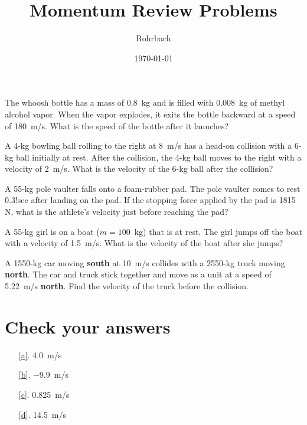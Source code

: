 \documentclass[10pt]{exam}
\title{Momentum Review Problems}
\author{Rohrbach}
\date{\today}
\begin{document}
\maketitle

\begin{questions}


\question
  The whoosh bottle has a mass of 0.8~kg and is filled with 0.008~kg of methyl alcohol vapor.  When the vapor explodes, it exits the bottle backward at a speed of 180~m/s.  What is the speed of the bottle after it launches?
  \vs


  
\question \label{a}
  A 4-kg bowling ball rolling to the right at 8~m/s has a head-on collision with a 6-kg ball initially at rest. After the collision, the 4-kg ball moves to the right with a velocity of 2~m/s. What is the velocity of the 6-kg ball after the collision?
  \vs


\question \label{b}
  A 55-kg pole vaulter falls onto a foam-rubber pad. The pole vaulter comes to rest 0.3!sec after landing on the pad. If the stopping force applied by the pad is 1815 N, what is the athlete's velocity just before reaching the pad?
  \vs

\pagebreak

\question \label{c}
  A 55-kg girl is on a boat ($m = 100$~kg) that is at rest. The girl jumps off the boat with a velocity of 1.5~m/s. What is the velocity of the boat after she jumps?
  \vs

\question \label{d}
  A 1550-kg car moving {\bf south} at 10~m/s collides with a 2550-kg truck moving {\bf north}. The car and truck stick together and move as a unit at a speed of 5.22~m/s {\bf north}. Find the velocity of the truck before the collision.
  \vs

\end{questions}


\section*{Check your answers}

\begin{enumerate}
  \item[\ref{a}.] 4.0~m/s 
  \item[\ref{b}.] $-9.9$~m/s 
  \item[\ref{c}.] 0.825~m/s 
  \item[\ref{d}.] 14.5~m/s 

\end{enumerate}
\end{document}
